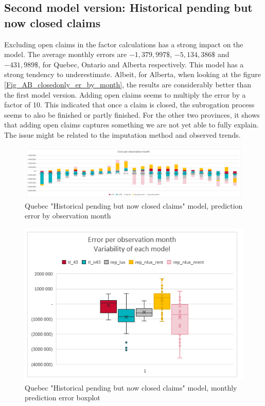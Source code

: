 \subsection{Second model version: Historical pending but now closed claims}
	Excluding open claims in the factor calculations has a strong impact on the model. The average monthly errors are $-1,379,997 \$ $, $-5,134,386 \$ $ and $-431,989\$ $, for Quebec, Ontario and Alberta respectively. This model has a strong tendency to underestimate. Albeit, for Alberta, when looking at the figure \ref{Fig_AB_closedonly_er_by_month}, the results are considerably better than the first model version. Adding open claims seems to multiply the error by a factor of 10. This indicated that once a claim is closed, the subrogation process seems to also be finished or partly finished. For the other two provinces, it shows that adding open claims captures something we are not yet able to fully explain. The issue might be related to the imputation method and observed trends.
		\begin{figure}[H]
			\begin{center}
				\includegraphics[scale=0.4]{Graphiques/QC_closedonly_model_by_month} 
				\renewcommand{\figurename}{Figure}
				\caption[Quebec version two model error]{Quebec "Historical pending but now closed claims" model, prediction error by observation month}\label{Fig_QC_closedonly_er_by_month}
			\end{center}
		\end{figure}
		\begin{figure}[H]
			\begin{center}
				\includegraphics[scale=0.4]{Graphiques/QC_closedonly_model_mustach} 
				\renewcommand{\figurename}{Figure}
				\caption[Quebec version two model error - boxplot]{Quebec "Historical pending but now closed claims" model, monthly prediction error boxplot}\label{Fig_QC_closedonly_er_boxplot}
			\end{center}
		\end{figure}

